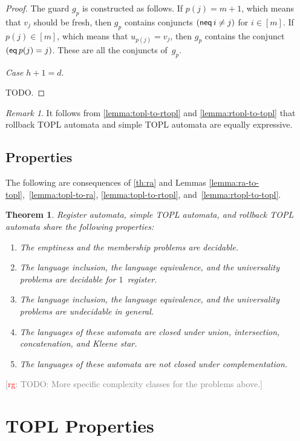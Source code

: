 \documentclass[9pt, preprint]{sigplanconf} %
\newcommand{\noterg}[2]{\textcolor{gray}{[\textcolor{red}{#1}: #2]}}
\newcommand{\rg}[1]{\noterg{rg}{#1}}
\newtheorem{theorem}{Theorem}
\theoremstyle{definition}
\theoremstyle{remark}
\newtheorem{remark}{Remark}
\begin{document}
\begin{proof}
The guard $g_p$ is constructed as follows.
If $p(j)=m+1$, which means that $v_j$ should be fresh, then $g_p$ contains conjuncts $({\sf neq}\,i\ne j)$ for $i\in[m]$.
If $p(j)\in[m]$, which means that $u_{p(j)}=v_j$, then $g_p$ contains the conjunct $({\sf eq}\,p(j)=j)$.
These are all the conjuncts of~$g_p$.

{\it Case $h+1=d$}.
\smallskip

TODO\null.
\end{proof}

\begin{remark}
It follows from \autoref{lemma:topl-to-rtopl} and \autoref{lemma:rtopl-to-topl} that rollback TOPL automata and simple TOPL automata are equally expressive.
\end{remark}

\subsection{Properties} %

The following are consequences of \autoref{th:ra} and Lemmas \ref{lemma:ra-to-topl},~\ref{lemma:topl-to-ra}, \ref{lemma:topl-to-rtopl}, and~\ref{lemma:rtopl-to-topl}.

\begin{theorem}\label{th:main}
Register automata, simple TOPL automata, and rollback TOPL automata share the following properties:
\begin{enumerate}
\item The emptiness and the membership problems are decidable.
\item The language inclusion, the language equivalence, and the universality problems are decidable for $1$~register.
\item The language inclusion, the language equivalence, and the universality problems are undecidable in general.
\item The languages of these automata are closed under union, intersection, concatenation, and Kleene star.
\item The languages of these automata are not closed under complementation.
\end{enumerate}
\end{theorem}
\rg{TODO: More specific complexity classes for the problems above.}

\section{TOPL Properties}\label{sec:topl} %
\end{document}
